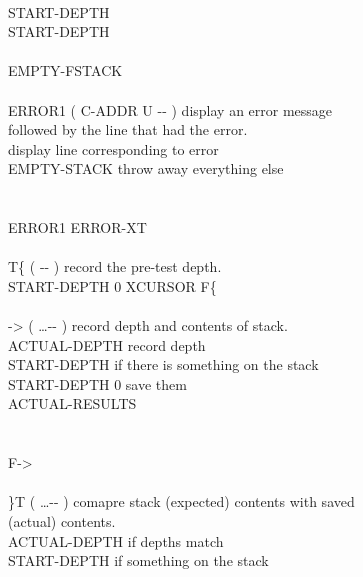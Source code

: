 \begin{tt}
\tab {} \\
\tab {} START-DEPTH    \\
\tab[2]  START-DEPTH     \\
\tab {} \\
\tab EMPTY-FSTACK \word{;} \\
\\
\word{:} ERROR1	 ( C-ADDR U -{}- ) display an error message  \\
\tab[4.8]  followed by the line that had the error. \\
\tab {}   			 display line corresponding to error \\
\tab EMPTY-STACK          throw away everything else \\
\word{;} \\
\\
 ERROR1 ERROR-XT \word{!} \\
\\
\word{:} T\{		 ( -{}- ) record the pre-test depth. \\
\tab {} START-DEPTH \word{!} 0 XCURSOR \word{!} F\{ \word{;} \\
\\
\word{:} ->		 ( \ldots -{}- ) record depth and contents of stack. \\
\tab {}  ACTUAL-DEPTH \word{!}		 record depth \\
\tab START-DEPTH   		 if there is something on the stack \\
\tab[2]  START-DEPTH  \word{-} 0   save them \\
\tab[3] 		ACTUAL-RESULTS   \word{+} \word{!} \\
\tab[2]  \\
\tab {} \\
\tab F-> \word{;} \\
\\
\word{:} \}T		 ( \ldots -{}- ) comapre stack (expected) contents with saved \\
\tab   {} (actual) contents. \\
\tab {} ACTUAL-DEPTH  \word{=} 		\tab[4.0]	 if depths match \\
\tab[2]  START-DEPTH   	\tab[3.6]	 if something on the stack \\

\end{tt}
